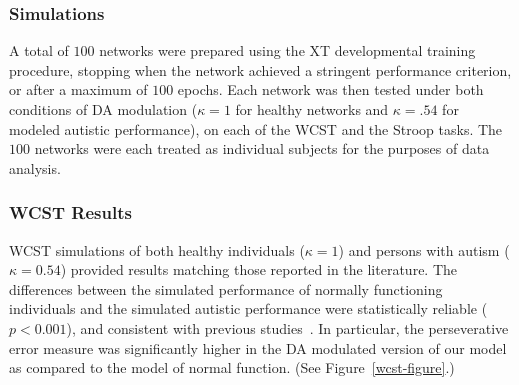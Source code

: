 \subsubsection{Simulations} 
A total of $100$ networks were prepared using the XT developmental
training procedure, stopping when the network achieved a stringent
performance criterion, or after a maximum of $100$ epochs.  Each
network was then tested under both conditions of DA modulation ($\kappa = 1$ for healthy networks and $\kappa = .54$ for modeled autistic performance), on
each of the WCST and the Stroop tasks.  The $100$ networks were each
treated as individual subjects for the purposes of data analysis.

\subsubsection{WCST Results} 
WCST simulations of both healthy individuals ($\kappa = 1$) and persons with autism ($\kappa = 0.54$) 
provided results matching those reported in the literature.  The differences between the 
simulated performance of normally functioning individuals and the
simulated autistic performance were statistically reliable
($p < 0.001$), and consistent with previous
studies~\cite{PriorMR:1990:AutismWCST,Ozonoff:1999:AutismStroopWCST,MinshewNJ:2002:AutismWCST}.
In particular, the perseverative error measure was significantly
higher in the DA modulated version of our model as compared to the
model of normal function.  (See Figure~\ref{wcst-figure}.)


